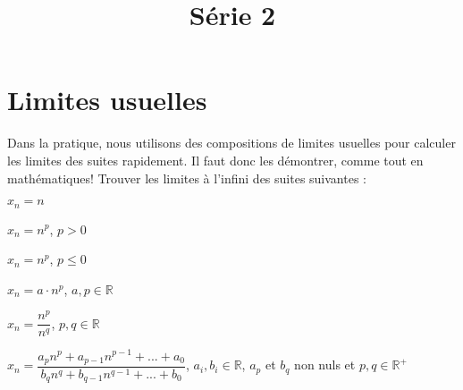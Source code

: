 \documentclass[a4paper, 12pt, french, twoside]{article}
\title{Série 2}
\newcommand{\Nn}{{\mathbb{N}}}
\newcommand{\Rr}{{\mathbb{R}}}
\begin{document}
\maketitle

\section{Limites usuelles}
Dans la pratique, nous utilisons des compositions de limites usuelles pour calculer les limites des suites rapidement. Il faut donc les démontrer, comme tout en mathématiques! Trouver les limites à l'infini des suites suivantes :

\begin{enumerate}
    

    \begin{multicols}{2}
    \item $x_n=n$
    \item $x_n= n^p$, $p>0$
    \item $x_n=n^p$, $p\leq 0$
    \item $x_n= a \cdot n^p$, $a,p\in \Rr$
    \item $x_n= \dfrac{n^p}{n^q}$, $p,q\in \Rr$
    \item $x_n=\dfrac{a_pn^p+a_{p-1}n^{p-1}+...+a_0}{b_qn^q+b_{q-1}n^{q-1}+...+b_0}$, $a_i,b_i\in \Rr$, $a_p$ et $b_q$ non nuls et $p,q \in \Rr^+$
    \end{multicols}
\end{enumerate}
\end{document}
